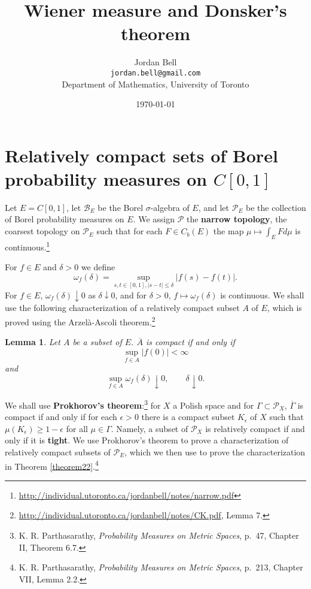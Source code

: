 \documentclass{article}
\newtheorem{lemma}[theorem]{Lemma}
\theoremstyle{definition}
\begin{document}
\title{Wiener measure and Donsker's theorem}
\author{Jordan Bell\\ \texttt{jordan.bell@gmail.com}\\Department of Mathematics, University of Toronto}
\date{\today}

\maketitle

\section{Relatively compact sets of Borel probability measures on $C[0,1]$}
Let $E=C[0,1]$, let $\mathscr{B}_E$ be the Borel $\sigma$-algebra of $E$, and let $\mathscr{P}_E$ be the collection of Borel probability measures on $E$. We assign $\mathscr{P}$ the \textbf{narrow topology}, the coarsest topology
on $\mathscr{P}_E$ such that for each $F \in C_b(E)$ the map $\mu \mapsto \int_E F d\mu$ is continuous.\footnote{\url{http://individual.utoronto.ca/jordanbell/notes/narrow.pdf}}



For $f \in E$ and $\delta>0$ we define
\[
\omega_f(\delta) = \sup_{s,t \in [0,1], |s-t| \leq \delta} |f(s)-f(t)|.
\]
For $f \in E$, $\omega_f(\delta) \downarrow 0$ as $\delta \downarrow 0$, and for $\delta>0$,
$f \mapsto \omega_f(\delta)$ is continuous.
We shall use the following characterization of a relatively compact subset $A$ of $E$, which is proved using the Arzel\`a-Ascoli theorem.\footnote{\url{http://individual.utoronto.ca/jordanbell/notes/CK.pdf},
Lemma 7.}

\begin{lemma}
Let $A$ be a  subset of $E$. $\overline{A}$ is compact if and only if
\[
\sup_{f \in A} |f(0)| < \infty
\]
and
\[
\sup_{f \in A} \omega_f(\delta) \downarrow 0,\qquad \delta \downarrow 0.
\]
\label{modulus}
\end{lemma}

We shall use \textbf{Prokhorov's theorem}:\footnote{K. R.
Parthasarathy, {\em Probability Measures on Metric Spaces}, p.~47, Chapter II, Theorem 6.7.}
for $X$ a Polish space and for $\Gamma \subset \mathscr{P}_X$, 
$\overline{\Gamma}$ is compact if and only if for each $\epsilon>0$ there is a compact
subset $K_\epsilon$ of $X$ such that $\mu(K_\epsilon) \geq 1-\epsilon$ for all $\mu \in \Gamma$. 
Namely, a subset of $\mathscr{P}_X$ is relatively compact if and only if it is \textbf{tight}.
We use Prokhorov's theorem to   prove a characterization of relatively compact subsets of $\mathscr{P}_E$, which we then use 
to prove the characterization  in Theorem \ref{theorem22}.\footnote{K. R.
Parthasarathy, {\em Probability  Measures on Metric Spaces}, p.~213, Chapter VII, Lemma 2.2.}
\end{document}
